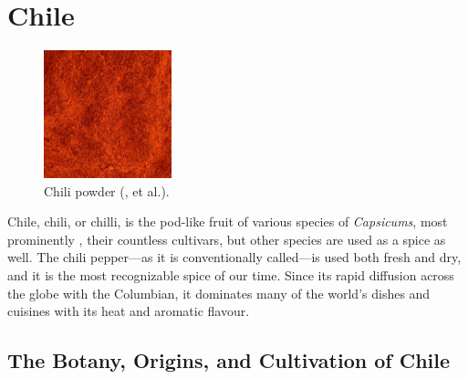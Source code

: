\section{Chile}
\label{sec:chile}






\begin{figure}
	\vspace{-\baselineskip}
	\includegraphics[width=0.33\textwidth]{imgs/spices/chile-1.jpg}
	\caption{Chili powder (, et al.).}
	\label{fig:chile}
\end{figure}

Chile, chili, or chilli, is the pod-like fruit of various species of \textit{Capsicums}, most prominently ,  their countless \glspl{cultivar}, but other species are used as a spice as well. The chili pepper---as it is conventionally called---is used both fresh and dry, and it is the most recognizable spice of our time. Since its rapid diffusion across the globe with the \gls{Columbian}, it dominates many of the world's dishes and cuisines with its heat and aromatic flavour. 

\subsection{The Botany, Origins, and Cultivation of Chile}

